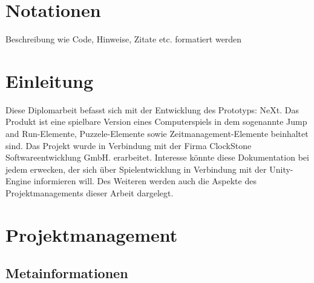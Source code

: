 

\def \currentAuthor {Lukas Vogel} %



\chapter*{Notationen}
Beschreibung wie Code, Hinweise, Zitate etc. formatiert werden  

\chapter{Einleitung}
Diese Diplomarbeit befasst sich mit der Entwicklung des Prototyps: NeXt. Das Produkt ist eine spielbare Version eines Computerspiels in dem sogenannte Jump and Run-Elemente, Puzzele-Elemente sowie Zeitmanagement-Elemente beinhaltet sind. Das Projekt wurde in Verbindung mit der Firma ClockStone Softwareentwicklung GmbH. erarbeitet. Interesse könnte diese Dokumentation bei jedem erwecken,	 der sich über Spielentwicklung in Verbindung mit der Unity-Engine  informieren will. Des Weiteren werden auch die Aspekte des Projektmanagements dieser Arbeit dargelegt.  

\chapter{Projektmanagement}

\section{Metainformationen}
